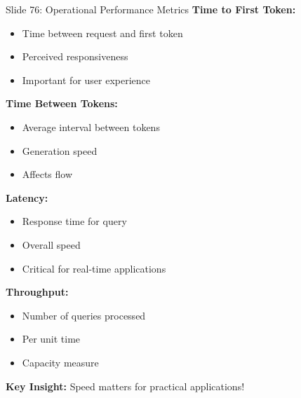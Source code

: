 \documentclass[8pt]{beamer}
\begin{document}
	
	\begin{frame}{Slide 76: Operational Performance Metrics}
		\fontsize{6.5}{7.5}\selectfont
		\textbf{Time to First Token:}
		\begin{itemize}
			\item Time between request and first token
			\item Perceived responsiveness
			\item Important for user experience
		\end{itemize}
		
		\vspace{0.1cm}
		\textbf{Time Between Tokens:}
		\begin{itemize}
			\item Average interval between tokens
			\item Generation speed
			\item Affects flow
		\end{itemize}
		
		\vspace{0.1cm}
		\textbf{Latency:}
		\begin{itemize}
			\item Response time for query
			\item Overall speed
			\item Critical for real-time applications
		\end{itemize}
		
		\vspace{0.1cm}
		\textbf{Throughput:}
		\begin{itemize}
			\item Number of queries processed
			\item Per unit time
			\item Capacity measure
		\end{itemize}
		
		\textcolor{myblue}{\textbf{Key Insight:}} Speed matters for practical applications!
	\end{frame}
	
\end{document}
